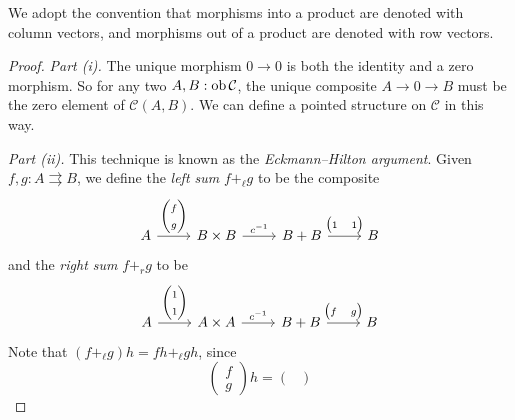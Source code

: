 We adopt the convention that morphisms into a product are denoted with column vectors, and morphisms out of a product are denoted with row vectors.
\begin{proof}
    \emph{Part (i).}
    The unique morphism \( 0 \to 0 \) is both the identity and a zero morphism.
    So for any two \( A, B : \operatorname{ob} \mathcal C \), the unique composite \( A \to 0 \to B \) must be the zero element of \( \mathcal C(A, B) \).
    We can define a pointed structure on \( \mathcal C \) in this way.

    \emph{Part (ii).}
    This technique is known as the \emph{Eckmann--Hilton argument}.
    Given \( f, g : A \rightrightarrows B \), we define the \emph{left sum} \( f +_\ell g \) to be the composite
\[\begin{tikzcd}[ampersand replacement=\&]
	A \& {B \times B} \& {B+B} \& B
	\arrow["{\begin{pmatrix}f \\ g\end{pmatrix}}", from=1-1, to=1-2]
	\arrow["{c^{-1}}", from=1-2, to=1-3]
	\arrow["{\begin{pmatrix}1&1\end{pmatrix}}", from=1-3, to=1-4]
\end{tikzcd}\]
    and the \emph{right sum} \( f +_r g \) to be
\[\begin{tikzcd}[ampersand replacement=\&]
	A \& {A \times A} \& {B+B} \& B
	\arrow["{\begin{pmatrix}1 \\ 1\end{pmatrix}}", from=1-1, to=1-2]
	\arrow["{c^{-1}}", from=1-2, to=1-3]
	\arrow["{\begin{pmatrix}f&g\end{pmatrix}}", from=1-3, to=1-4]
\end{tikzcd}\]
    Note that \( (f +_\ell g)h = fh +_\ell gh \), since
    \[ \begin{pmatrix}
        f \\ g
    \end{pmatrix} h = \begin{pmatrix}

\end{pmatrix}\]
\end{proof}
